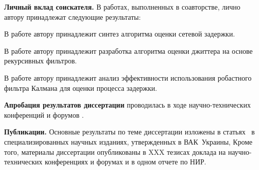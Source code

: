 \textbf{Личный вклад соискателя.} В работах, выполненных в соавторстве, лично автору принадлежат следующие результаты: 

В работе \cite{my1} автору принадлежит синтез алгоритма оценки сетевой задержки.

В работе \cite{my2} автору принадлежит разработка алгоритма оценки джиттера на основе рекурсивных фильтров.

В работе \cite{my4} автору принадлежит анализ эффективности использования робастного фильтра Калмана для оценки процесса задержки.

\textbf{Апробация результатов диссертации} проводилась в ходе научно-технических конференций и форумов \cite{my6,my7,my8,my9}. 


\textbf{Публикации.} Основные результаты по теме диссертации изложены в статьях~\cite{my1,my2,my3,my4,my5} в специализированных научных изданиях, утвержденных в ВАК~Украины, Кроме того, материалы диссертации опубликованы в XXX тезисах доклада на научно-технических конференциях и форумах \cite{my6,my7,my8,my9} и в одном отчете по НИР.


\clearpage